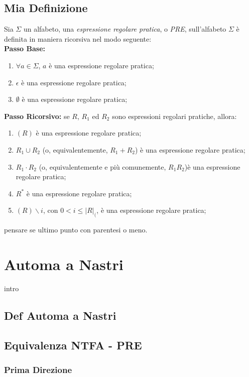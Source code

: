 \section{Mia Definizione}
\begin{definizione}
	Sia $\Sigma$ un alfabeto, una \textit{espressione regolare pratica}, o \textit{PRE}, sull'alfabeto $\Sigma$ è definita in maniera ricorsiva nel modo seguente:\\
	\textbf{Passo Base:}
	\begin{enumerate}
		\item $\forall a \in \Sigma$,  $a$ è una espressione regolare pratica;
		\item $\epsilon$ è una espressione regolare pratica;
		\item $\emptyset$ è una espressione regolare pratica;
	\end{enumerate}
	\textbf{Passo Ricorsivo:} se $R$, $R_1$ ed $R_2$ sono espressioni regolari pratiche, allora:
	\begin{enumerate}
		\item $(R)$ è una espressione regolare pratica;
		\item $R_1 \cup R_2$ (o, equivalentemente, $R_1 + R_2$) è una espressione regolare pratica;
		\item $R_1 \cdot R_2$ (o, equivalentemente e più comunemente, $R_1R_2$)è una espressione regolare pratica;
		\item $R^*$ è una espressione regolare pratica;
		\item $(R)\backslash i$, con $0 < i \leq \lvert R \rvert_($, è una espressione regolare pratica;
	\end{enumerate}
\end{definizione}
pensare se ultimo punto con parentesi o meno.

\chapter{Automa a Nastri}
\label{ch:automa}
intro
\section{Def Automa a Nastri}

\section{Equivalenza NTFA - PRE}
\subsection{Prima Direzione}
